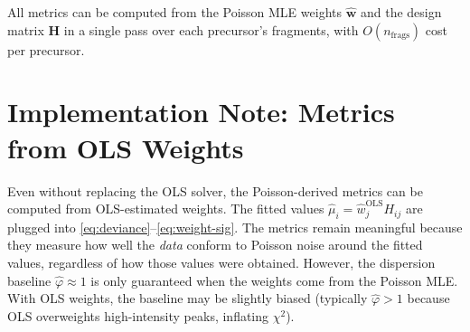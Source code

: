 \documentclass[11pt,a4paper]{article}
\begin{document}
\noindent All metrics can be computed from the Poisson MLE weights $\hat{\mathbf{w}}$ and
the design matrix $\mathbf{H}$ in a single pass over each precursor's fragments, with
$O(n_{\text{frags}})$ cost per precursor.

\section{Implementation Note: Metrics from OLS Weights}
\label{sec:ols-note}

Even without replacing the OLS solver, the Poisson-derived metrics can be computed from
OLS-estimated weights. The fitted values $\hat{\mu}_i = \hat{w}_j^{\text{OLS}} H_{ij}$ are
plugged into \eqref{eq:deviance}--\eqref{eq:weight-sig}. The metrics remain meaningful
because they measure how well the \emph{data} conform to Poisson noise around the fitted
values, regardless of how those values were obtained. However, the dispersion baseline
$\hat{\varphi} \approx 1$ is only guaranteed when the weights come from the Poisson MLE.
With OLS weights, the baseline may be slightly biased (typically $\hat{\varphi} > 1$
because OLS overweights high-intensity peaks, inflating $\chi^2$).
\end{document}
